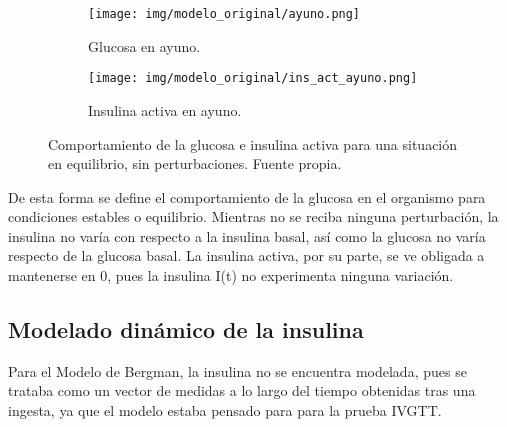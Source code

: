 \begin{figure}[htbp]
    \centering
    \begin{subfigure}[b]{0.9\linewidth} %
        \centering
        \texttt{[image: img/modelo\_original/ayuno.png]}
        \caption{Glucosa en ayuno.}
        \label{fig:bergman_ayunas_glucosa}
    \end{subfigure}
    
    \vspace{0.5cm} %

    \begin{subfigure}[b]{0.9\linewidth} %
        \centering
        \texttt{[image: img/modelo\_original/ins\_act\_ayuno.png]}
        \caption{Insulina activa en ayuno.}
        \label{fig:bergman_ayunas_insulina_activa}
    \end{subfigure}
    
    \caption{Comportamiento de la glucosa e insulina activa para una situación en equilibrio, sin perturbaciones. Fuente propia.}
    \label{fig:bergman_en_ayunas}
\end{figure}


De esta forma se define el comportamiento de la glucosa en el organismo para condiciones estables o equilibrio.
Mientras no se reciba ninguna perturbación, la insulina no varía con respecto a la insulina basal, así como la glucosa no varía respecto de la glucosa basal. La insulina activa, por su parte, se ve obligada a mantenerse en 0, pues la insulina I(t) no experimenta ninguna variación.

\subsection{Modelado dinámico de la insulina}

Para el Modelo de Bergman, la insulina no se encuentra modelada, pues se trataba como un vector de medidas a lo largo del tiempo obtenidas tras una ingesta, ya que el modelo estaba pensado para para la prueba IVGTT.

